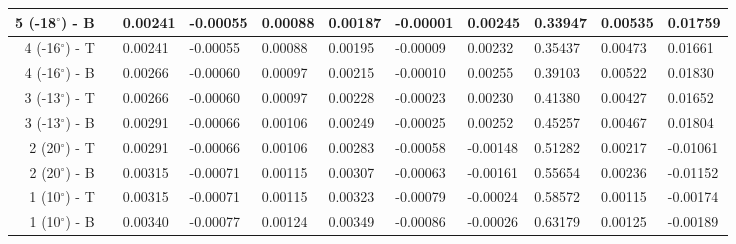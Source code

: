 \begin{table}[H]
\begin{longtable}{@{}rllllllllll@{}}
  5 (-18$^\circ$) - B &&       0.00241 &      -0.00055 &       0.00088 &       0.00187 &      -0.00001 &       0.00245 &     0.33947 &     0.00535 &     0.01759 \\\midrule
  4 (-16$^\circ$) - T &&       0.00241 &      -0.00055 &       0.00088 &       0.00195 &      -0.00009 &       0.00232 &     0.35437 &     0.00473 &     0.01661 \\
  4 (-16$^\circ$) - B &&       0.00266 &      -0.00060 &       0.00097 &       0.00215 &      -0.00010 &       0.00255 &     0.39103 &     0.00522 &     0.01830 \\\midrule
  3 (-13$^\circ$) - T &&       0.00266 &      -0.00060 &       0.00097 &       0.00228 &      -0.00023 &       0.00230 &     0.41380 &     0.00427 &     0.01652 \\
  3 (-13$^\circ$) - B &&       0.00291 &      -0.00066 &       0.00106 &       0.00249 &      -0.00025 &       0.00252 &     0.45257 &     0.00467 &     0.01804 \\\midrule
   2 (20$^\circ$) - T &&       0.00291 &      -0.00066 &       0.00106 &       0.00283 &      -0.00058 &      -0.00148 &     0.51282 &     0.00217 &    -0.01061 \\
   2 (20$^\circ$) - B &&       0.00315 &      -0.00071 &       0.00115 &       0.00307 &      -0.00063 &      -0.00161 &     0.55654 &     0.00236 &    -0.01152 \\\midrule
   1 (10$^\circ$) - T &&       0.00315 &      -0.00071 &       0.00115 &       0.00323 &      -0.00079 &      -0.00024 &     0.58572 &     0.00115 &    -0.00174 \\
   1 (10$^\circ$) - B &&       0.00340 &      -0.00077 &       0.00124 &       0.00349 &      -0.00086 &      -0.00026 &     0.63179 &     0.00125 &    -0.00189 \\\midrule
\end{longtable}
\end{table}